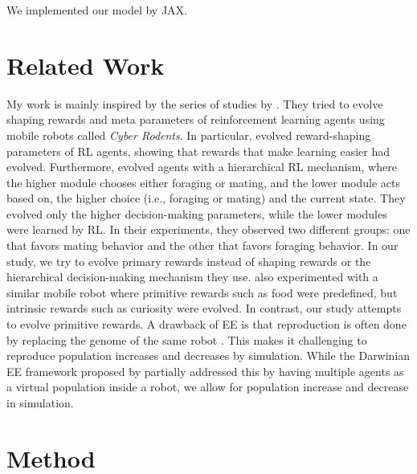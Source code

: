 We implemented our model by JAX.

\section{Related Work}
My work is mainly inspired by the series of studies by \citet{elfwingBiologicallyInspiredEmbodied2005,elfwingDarwinianEmbodiedEvolution2011a,elfwingEmergencePolymorphicMating2014}. They tried to evolve shaping rewards and meta parameters of reinforcement learning agents using mobile robots called \textit{Cyber Rodents}. In particular, \citet{elfwingDarwinianEmbodiedEvolution2011a} evolved reward-shaping parameters of RL agents, showing that rewards that make learning easier had evolved. Furthermore, \citet{elfwingEmergencePolymorphicMating2014} evolved agents with a hierarchical RL mechanism, where the higher module chooses either foraging or mating, and the lower module acts based on, the higher choice (i.e., foraging or mating) and the current state. They evolved only the higher decision-making parameters, while the lower modules were learned by RL\@. In their experiments, they observed two different groups: one that favors mating behavior and the other that favors foraging behavior. In our study, we try to evolve primary rewards instead of shaping rewards or the hierarchical decision-making mechanism they use. \citet{uchibeFindingIntrinsicRewards2008} also experimented with a similar mobile robot where primitive rewards such as food were predefined, but intrinsic rewards such as curiosity were evolved. In contrast, our study attempts to evolve primitive rewards. A drawback of EE is that reproduction is often done by replacing the genome of the same robot \citep{bredecheEmbodiedEvolutionCollective2018}. This makes it challenging to reproduce population increases and decreases by simulation. While the Darwinian EE framework proposed by \citet{elfwingDarwinianEmbodiedEvolution2011a} partially addressed this by having multiple agents as a virtual population inside a robot, we allow for population increase and decrease in simulation.

\section{Method}